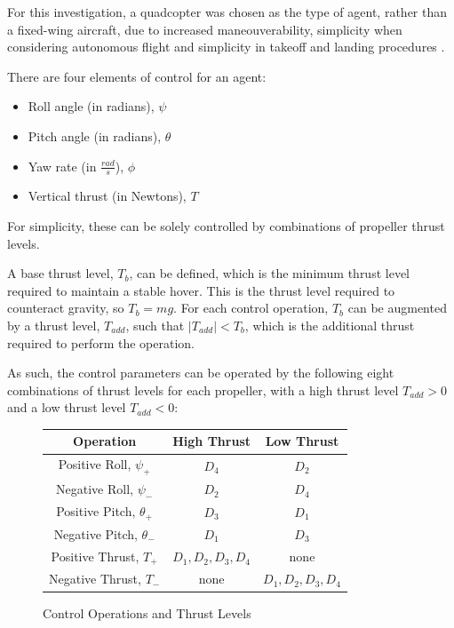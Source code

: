 \documentclass{article}
\begin{document}
For this investigation, a quadcopter was chosen as the type of agent, rather than a fixed-wing aircraft, due to increased maneouverability, simplicity when considering autonomous flight and simplicity in takeoff and landing procedures \cite{Thamm}.

There are four elements of control for an agent:
\begin{itemize}
    \item Roll angle (in radians), $\psi$
    \item Pitch angle (in radians), $\theta$
    \item Yaw rate (in $\frac{rad}{s}$), $\phi$
    \item Vertical thrust (in Newtons), $T$
\end{itemize}

For simplicity, these can be solely controlled by combinations of propeller thrust levels. 

A base thrust level, $T_b$, can be defined, which is the minimum thrust level required to maintain a stable hover. This is the thrust level required to counteract gravity, so $T_b = mg$. For each control operation, $T_b$ can be augmented by a thrust level, $T_{add}$, such that $|T_{add}| < T_b$, which is the additional thrust required to perform the operation.

As such, the control parameters can be operated by the following eight combinations of thrust levels for each propeller, with a high thrust level $T_{add} > 0$ and a low thrust level $T_{add} < 0$:


\begin{figure}[H]
    \begin{center}
    \begin{tabular}{| c | c | c |} 
    \hline
    Operation & High Thrust & Low Thrust \\ 
    \hline
    Positive Roll, $\psi_+$ & $D_4$ & $D_2$ \\
    \hline
    Negative Roll, $\psi_-$ & $D_2$ & $D_4$ \\
    \hline
    Positive Pitch, $\theta_+$ & $D_3$ & $D_1$ \\
    \hline
    Negative Pitch, $\theta_-$ & $D_1$ & $D_3$ \\
    \hline
    Positive Thrust, $T_+$ & $D_1, D_2, D_3, D_4$ & none \\
    \hline
    Negative Thrust, $T_-$ & none & $D_1, D_2, D_3, D_4$ \\
    \hline
    \end{tabular}
    \end{center}
    \caption{Control Operations and Thrust Levels}
    \label{fig:control}
\end{figure}
\end{document}
